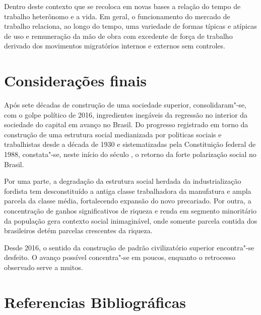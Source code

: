 Dentro deste contexto que se recoloca em novas bases a relação do tempo
de trabalho heterônomo e a vida. Em geral, o funcionamento do mercado de
trabalho relaciona, ao longo do tempo, uma variedade de formas típicas e
atípicas de uso e remuneração da mão de obra com excedente de força de
trabalho derivado dos movimentos migratórios internos e externos sem
controles.

\section{Considerações finais}

Após sete décadas de construção de uma sociedade superior,
consolidaram"-se, com o golpe político de 2016, ingredientes inegáveis da
regressão no interior da sociedade do capital em avanço no Brasil. Do
progresso registrado em torno da construção de uma estrutura social
medianizada por politicas sociais e trabalhistas desde a década de 1930
e sistematizadas pela Constituição federal de 1988, constata"-se, neste
início do século , o retorno da forte polarização social no Brasil.

Por uma parte, a degradação da estrutura social herdada da
industrialização fordista tem desconstituído a antiga classe
trabalhadora da manufatura e ampla parcela da classe média, fortalecendo
expansão do novo precariado. Por outra, a concentração de ganhos
significativos de riqueza e renda em segmento minoritário da população
gera contexto social inimaginável, onde somente parcela contida dos
brasileiros detém parcelas crescentes da riqueza.

Desde 2016, o sentido da construção de padrão civilizatório superior
encontra"-se desfeito. O avanço possível concentra"-se em poucos, enquanto
o retrocesso observado serve a muitos.

\section{Referencias Bibliográficas}

